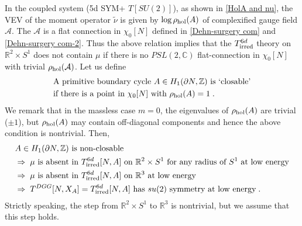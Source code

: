 \documentclass[a4paper,11pt]{article}
\def\cA{\mathcal{A}}
\def\CA{{\cal A}}
\def\BR{{\mathbb R}}
\begin{document}
In the coupled system (5d SYM+ $T[SU(2)]$), as shown in  \eqref{HolA and nu}, the VEV of the moment operator $\widetilde{\nu}$ is given by 
$\log  \rho_{\rm hol} (A)$  of complexified gauge field $\cA$. 
The $\cA$ is a flat connection in $\chi_0[N]$ defined in \eqref{Dehn-surgery com} and \eqref{Dehn-surgery com-2}. %
Thus the above relation implies  that the $T^{6d}_{\rm irred}$ theory on $\mathbb{R}^2\times S^1$  does not contain  $\mu$ if there is no $PSL(2,\mathbb{C})$ flat-connection in 
$\chi_0[N]$ with trivial $ \rho_{\rm hol}(\CA)$. Let us define 
%
\begin{align}
\begin{split}
&\textrm{A primitive boundary cycle $A\in H_1 (\partial N, \mathbb{Z})$ is `closable'}
\\
&\textrm{if there is a point in $\chi_0[N]$ with $ \rho_{\rm hol}(A)= 1$\;.} \label{Def : closable cycle}
\end{split}
\end{align}
%
We remark that in the massless case $m=0$, the eigenvalues of $ \rho_{\rm hol}(A)$ are trivial ($\pm 1$), but $ \rho_{\rm hol}(A)$ may contain off-diagonal components
and hence the above condition is nontrivial.
Then,
%
\begin{align}
\begin{split}
&\textrm{$A \in H_1 (\partial N, \mathbb{Z})$ is non-closable } 
\\
& \Rightarrow \; \textrm{$\mu$ is absent in $T^{6d}_{\rm irred} [N,A]$ on $\mathbb{R}^2 \times S^1$ for any radius of $S^1$ at low energy} 
\\
& \Rightarrow \; \textrm{$\mu$ is absent in $T^{6d}_{\rm irred} [N,A]$ on $\mathbb{R}^3$ at low energy } 
\\
&\Rightarrow \; T^{DGG}[N,X_A]= T^{6d}_{\rm irred}[N,A] \textrm{ has $su(2)$ symmetry at low energy}\;.
\end{split}
\end{align}
%
Strictly speaking, the step from $\BR^2 \times S^1$ to $\BR^3$ is nontrivial, but we assume that this step holds.
\end{document}
